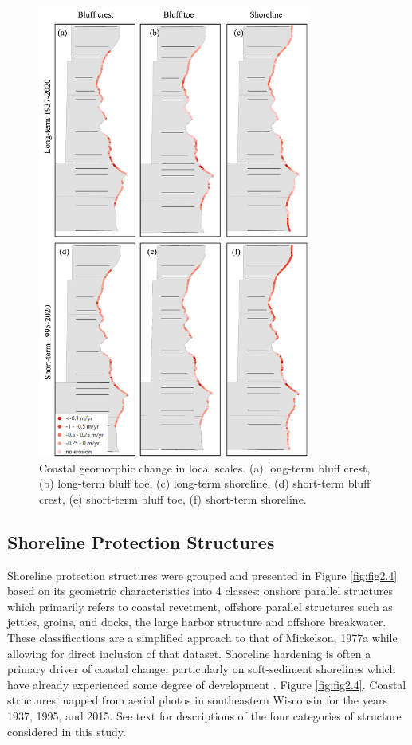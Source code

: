 \begin{figure}[htbp] \centering
\includegraphics[width=0.8\textwidth]{chapter2/resources/figure2-3.jpg}
\caption{Coastal geomorphic change in local scales. (a) long-term bluff crest,
(b) long-term bluff toe, (c) long-term shoreline, (d) short-term bluff crest,
(e) short-term bluff toe, (f) short-term shoreline.} 
\label{fig:fig2.3}
\end{figure}

\subsection{Shoreline Protection Structures} 
\label{Shoreline Protection Structures} 

Shoreline protection structures were grouped and presented in Figure
\ref{fig:fig2.4} based on its geometric characteristics into 4 classes: onshore
parallel structures which primarily refers to coastal revetment, offshore
parallel structures such as jetties, groins, and docks, the large harbor
structure and offshore breakwater. These classifications are a simplified
approach to that of Mickelson, 1977a while allowing for direct inclusion of that
dataset. Shoreline hardening is often a primary driver of coastal change,
particularly on soft-sediment shorelines which have already experienced some
degree of development \citep{brown2012human}. Figure \ref{fig:fig2.4}. Coastal
structures mapped from aerial photos in southeastern Wisconsin for the years
1937, 1995, and 2015. See text for descriptions of the four categories of
structure considered in this study.

